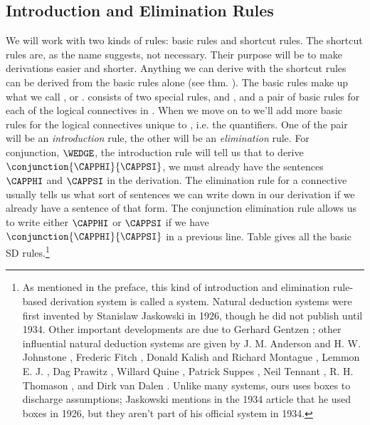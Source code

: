 \subsection{Introduction and Elimination Rules} 
We will work with two kinds of rules: basic rules and shortcut rules. 
The shortcut rules are, as the name suggests, not necessary. 
Their purpose will be to make derivations easier and shorter. 
Anything we can derive with the shortcut rules can be derived from the basic rules alone (see thm. ). 
The basic rules make up what we call , or \GSD{}. 
\GSD{} consists of two special rules,  and , and a pair of basic rules for each of the logical connectives in \GSL{}. 
When we move on to \GQL{} we'll add more basic rules for the logical connectives unique to \GQL{}, i.e. the quantifiers. 
One of the pair will be an \emph{introduction} rule, the other will be an \emph{elimination} rule. 
For conjunction, $\WEDGE$, the introduction rule will tell us that to derive $\conjunction{\CAPPHI}{\CAPPSI}$, we must already have the sentences $\CAPPHI$ and $\CAPPSI$ in the derivation. 
The elimination rule for a connective usually tells us what sort of sentences we can write down in our derivation if we already have a sentence of that form.  The conjunction elimination rule allows us to write either $\CAPPHI$ or $\CAPPSI$ if we have $\conjunction{\CAPPHI}{\CAPPSI}$ in a previous line.
Table  gives all the basic SD rules.\footnote{As mentioned in the preface, this kind of introduction and elimination rule-based derivation system is called a  system.
Natural deduction systems were first invented by Stanislaw Jaskowski in 1926, though he did not publish until 1934.  Other important developments are due to Gerhard Gentzen \citeyearpar{Gentzen1934}; other influential natural deduction systems are given by J. M. Anderson and H. W. Johnstone \citeyearpar{Anderson1962}, Frederic Fitch \citeyearpar{Fitch1952}, Donald Kalish and Richard Montague \citeyearpar{Kalish1964}, Lemmon E. J. \citeyearpar{Lemmon1965}, Dag Prawitz \citeyearpar{Prawitz1965}, Willard Quine \citeyearpar{Quine1950}, Patrick Suppes \citeyearpar{Suppes1957}, Neil Tennant \citeyearpar{Tennant1978}, R. H. Thomason \citeyearpar{Thomason1970}, and Dirk van Dalen \citeyearpar{Dalen1980} \citep[28]{Hodges2001}.  Unlike many systems, ours uses boxes to discharge assumptions; Jaskowski mentions in the 1934 article that he used boxes in 1926, but they aren't part of his official system in 1934.}
